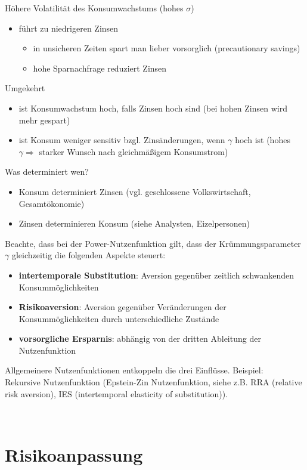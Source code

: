 \documentclass[12pt]{extreport} %
\theoremstyle{named}
\theoremstyle{nnamed}
\theoremstyle{itshape}
\theoremstyle{normal}
\begin{document}
Höhere Volatilität des Konsumwachstums (hohes $\sigma$)
\begin{itemize}
	\item führt zu niedrigeren Zinsen
		\begin{itemize}
			\item in unsicheren Zeiten spart man lieber vorsorglich (precautionary savings)
			\item hohe Sparnachfrage reduziert Zinsen %
		\end{itemize}
\end{itemize}

Umgekehrt
\begin{itemize}
	\item ist Konsumwachstum hoch, falls Zinsen hoch sind (bei hohen Zinsen wird mehr gespart)
	\item ist Konsum weniger sensitiv bzgl. Zinsänderungen, wenn $\gamma$ hoch ist (hohes $\gamma \Rightarrow$ starker Wunsch nach gleichmäßigem Konsumstrom)
\end{itemize}

Was determiniert wen?
\begin{itemize}
	\item Konsum determiniert Zinsen (vgl. geschlossene Volkswirtschaft, Gesamtökonomie)
	\item Zinsen determinieren Konsum (siehe Analysten, Eizelpersonen)
\end{itemize}

Beachte, dass bei der Power-Nutzenfunktion gilt, dass der Krümmungsparameter $\gamma$ gleichzeitig die folgenden Aspekte steuert:
\begin{itemize}
	\item \textbf{intertemporale Substitution}: Aversion gegenüber zeitlich schwankenden Konsummöglichkeiten
	\item \textbf{Risikoaversion}: Aversion gegenüber Veränderungen der Konsummöglichkeiten durch unterschiedliche Zustände
	\item \textbf{vorsorgliche Ersparnis}: abhängig von der dritten Ableitung der Nutzenfunktion
\end{itemize}
 Allgemeinere Nutzenfunktionen entkoppeln die drei Einflüsse. Beispiel: ~ Rekursive Nutzenfunktion (Epstein-Zin Nutzenfunktion, siehe z.B. RRA (relative risk aversion), IES (intertemporal elasticity of substitution)). 

~\newpage

\section{Risikoanpassung}
\end{document}

